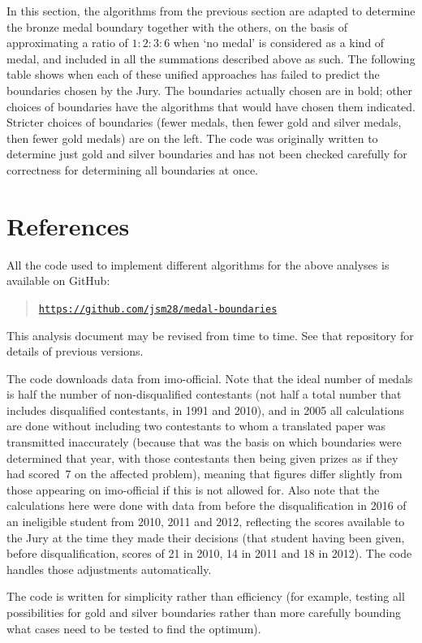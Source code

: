 \documentclass[a4paper,10pt]{article}
\begin{document}
In this section, the algorithms from the previous section are adapted
to determine the bronze medal boundary together with the others, on
the basis of approximating a ratio of $1:2:3:6$ when `no medal' is
considered as a kind of medal, and included in all the summations
described above as such.  The following table shows when each of these
unified approaches has failed to predict the boundaries chosen by the
Jury.  The boundaries actually chosen are in bold; other choices of
boundaries have the algorithms that would have chosen them indicated.
Stricter choices of boundaries (fewer medals, then fewer gold and
silver medals, then fewer gold medals) are on the left.  The code was
originally written to determine just gold and silver boundaries and
has not been checked carefully for correctness for determining all
boundaries at once.



\section*{References}

All the code used to implement different algorithms for the above
analyses is available on GitHub:

\begin{quote}
\texttt{\href{https://github.com/jsm28/medal-boundaries}{https://github.com/jsm28/medal-boundaries}}
\end{quote}

This analysis document may be revised from time to time.  See that
repository for details of previous versions.

The code downloads data from imo-official.  Note that the ideal number
of medals is half the number of non-disqualified contestants (not half
a total number that includes disqualified contestants, in 1991 and
2010), and in 2005 all calculations are done without including two
contestants to whom a translated paper was transmitted inaccurately
(because that was the basis on which boundaries were determined that
year, with those contestants then being given prizes as if they had
scored~7 on the affected problem), meaning that figures differ
slightly from those appearing on imo-official if this is not allowed
for.  Also note that the calculations here were done with data from
before the disqualification in 2016 of an ineligible student from
2010, 2011 and 2012, reflecting the scores available to the Jury at
the time they made their decisions (that student having been given,
before disqualification, scores of 21 in 2010, 14 in 2011 and 18 in
2012).  The code handles those adjustments automatically.

The code is written for simplicity rather than efficiency (for
example, testing all possibilities for gold and silver boundaries
rather than more carefully bounding what cases need to be tested to
find the optimum).
\end{document}
